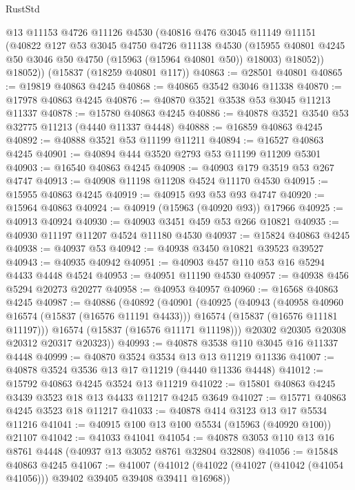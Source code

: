 \begin{lexlean}{RustStd}
\begin{coremodule}
{\begin{coremodule}
{{{{{{{{{{{{{{{{{{{{{{{{{{{{{{{{{{{{{{{{{{{{{{{{{{{{{{{{{{{{        @13
        @11153
        @4726
        @11126
        @4530
        (@40816
          @476
          @3045
          @11149
          @11151
          (@40822
            @127
            @53
            @3045
            @4750
            @4726
            @11138
            @4530
            (@15955 @40801 @4245 @50 @3046 @50 @4750 (@15963 (@15964 @40801 @50)) @18003)
            @18052))
        @18052))
    (@15837 (@18259 @40801 @117))
@40863 := @28501 @40801
@40865 := @19819 @40863 @4245
@40868 := @40865 @3542 @3046 @11338
@40870 := @17978 @40863 @4245
@40876 := @40870 @3521 @3538 @53 @3045 @11213 @11337
@40878 := @15780 @40863 @4245
@40886 := @40878 @3521 @3540 @53 @32775 @11213 (@4440 @11337 @4448)
@40888 := @16859 @40863 @4245
@40892 := @40888 @3521 @53 @11199 @11211
@40894 := @16527 @40863 @4245
@40901 := @40894 @444 @3520 @2793 @53 @11199 @11209 @5301
@40903 := @16540 @40863 @4245
@40908 := @40903 @179 @3519 @53 @267 @4747
@40913 := @40908 @11198 @11208 @4524 @11170 @4530
@40915 := @15955 @40863 @4245
@40919 := @40915 @93 @53 @93 @4747
@40920 := @15964 @40863
@40924 := @40919 (@15963 (@40920 @93)) @17966
@40925 := @40913 @40924
@40930 := @40903 @3451 @459 @53 @266 @10821
@40935 := @40930 @11197 @11207 @4524 @11180 @4530
@40937 := @15824 @40863 @4245
@40938 := @40937 @53
@40942 := @40938 @3450 @10821 @39523 @39527
@40943 := @40935 @40942
@40951 := @40903 @457 @110 @53 @16 @5294 @4433 @4448 @4524
@40953 := @40951 @11190 @4530
@40957 := @40938 @456 @5294 @20273 @20277
@40958 := @40953 @40957
@40960 := @16568 @40863 @4245
@40987 := @40886
    (@40892
      (@40901
        (@40925
          (@40943
            (@40958 @40960 @16574 (@15837 (@16576 @11191 @4433)))
            @16574
            (@15837 (@16576 @11181 @11197)))
          @16574
          (@15837 (@16576 @11171 @11198)))
        @20302
        @20305
        @20308
        @20312
        @20317
        @20323))
@40993 := @40878 @3538 @110 @3045 @16 @11337 @4448
@40999 := @40870 @3524 @3534 @13 @13 @11219 @11336
@41007 := @40878 @3524 @3536 @13 @17 @11219 (@4440 @11336 @4448)
@41012 := @15792 @40863 @4245 @3524 @13 @11219
@41022 := @15801 @40863 @4245 @3439 @3523 @18 @13 @4433 @11217 @4245 @3649
@41027 := @15771 @40863 @4245 @3523 @18 @11217
@41033 := @40878 @414 @3123 @13 @17 @5534 @11216
@41041 := @40915 @100 @13 @100 @5534 (@15963 (@40920 @100)) @21107
@41042 := @41033 @41041
@41054 := @40878 @3053 @110 @13 @16 @8761 @4448 (@40937 @13 @3052 @8761 @32804 @32808)
@41056 := @15848 @40863 @4245
@41067 := @41007
    (@41012 (@41022 (@41027 (@41042 (@41054 @41056))) @39402 @39405 @39408 @39411 @16968))
}}}}}}}}}}}}}}}}}}}}}}}}}}}}}}}}}}}}}}}}}}}}}}}}}}}}}}}}}}}}
\end{coremodule}}
\end{coremodule}
\end{lexlean}

